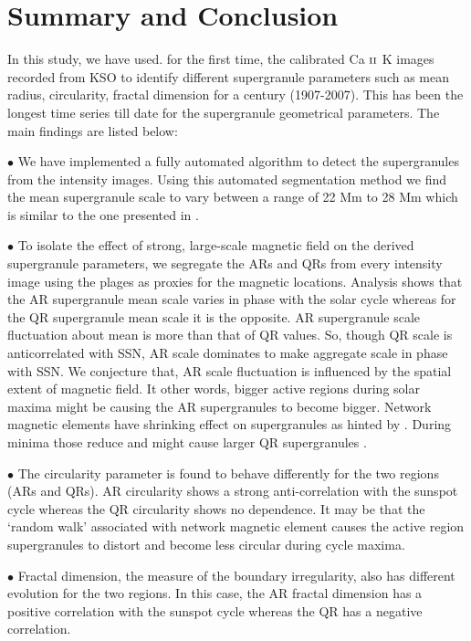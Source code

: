 \documentclass[manuscript]{aastex}	%
\begin{document}
 \section{Summary and Conclusion} \label{sec:summary}

 In this study, we have used. for the first time, the calibrated C\MakeLowercase{a}  $\scriptsize{{\textrm{II}}}$ K images recorded from KSO to identify different supergranule parameters such as mean radius, circularity, fractal dimension for a century (1907-2007). This has been the longest time series till date for the supergranule geometrical parameters. The main findings are listed below:


$\bullet$ We have implemented a fully automated algorithm to detect the supergranules from the intensity images. Using this automated segmentation method  we find the mean supergranule scale to vary between a range of 22 Mm to 28 Mm which is similar to the one presented in \citet{2041-8205-730-1-L3}.

$\bullet$ To isolate the effect of strong, large-scale magnetic field on the derived supergranule parameters, we segregate the ARs and QRs from every intensity image using the plages as proxies for the magnetic locations. Analysis shows that the AR supergranule mean scale varies in phase with the solar cycle whereas for the QR supergranule mean scale it is the opposite. AR supergranule scale fluctuation about mean is more than that of QR values. So, though QR scale is anticorrelated with SSN, AR scale dominates to make aggregate scale in phase with SSN. We conjecture that, AR scale fluctuation is influenced by the spatial extent of magnetic field. It other words, bigger active regions during solar maxima might be causing the AR supergranules to become bigger. Network magnetic elements have shrinking effect on supergranules as hinted by \citet{2008A&A...488.1109M}. During minima those reduce and might cause larger QR supergranules . 

$\bullet$ The circularity parameter is found to behave differently for the two regions (ARs and QRs). AR circularity shows a strong anti-correlation with the sunspot cycle whereas the QR circularity shows no dependence. It may be that the `random walk' associated with network magnetic element causes the active region supergranules  to distort and become less circular during cycle maxima.

$\bullet$ Fractal dimension, the measure of the boundary irregularity, also has different evolution for the two regions. In this case, the AR fractal dimension has a positive correlation with the sunspot cycle whereas the QR has a negative correlation.
\end{document}
